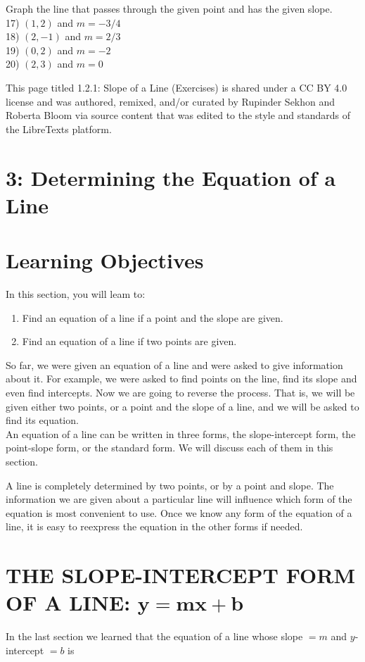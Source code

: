 Graph the line that passes through the given point and has the given slope.\\
17) $(1,2)$ and $m=-3 / 4$\\
18) $(2,-1)$ and $m=2 / 3$\\
19) $(0,2)$ and $m=-2$\\
20) $(2,3)$ and $m=0$

This page titled 1.2.1: Slope of a Line (Exercises) is shared under a CC BY 4.0 license and was authored, remixed, and/or curated by Rupinder Sekhon and Roberta Bloom via source content that was edited to the style and standards of the LibreTexts platform.

\section*{3: Determining the Equation of a Line}
\section*{Learning Objectives}
In this section, you will leam to:

\begin{enumerate}
  \item Find an equation of a line if a point and the slope are given.
  \item Find an equation of a line if two points are given.
\end{enumerate}

So far, we were given an equation of a line and were asked to give information about it. For example, we were asked to find points on the line, find its slope and even find intercepts. Now we are going to reverse the process. That is, we will be given either two points, or a point and the slope of a line, and we will be asked to find its equation.\\
An equation of a line can be written in three forms, the slope-intercept form, the point-slope form, or the standard form. We will discuss each of them in this section.

A line is completely determined by two points, or by a point and slope. The information we are given about a particular line will influence which form of the equation is most convenient to use. Once we know any form of the equation of a line, it is easy to reexpress the equation in the other forms if needed.

\section*{THE SLOPE-INTERCEPT FORM OF A LINE: $\boldsymbol{y}=\boldsymbol{m} \boldsymbol{x}+\boldsymbol{b}$}
In the last section we learned that the equation of a line whose slope $=m$ and $y$-intercept $=b$ is

